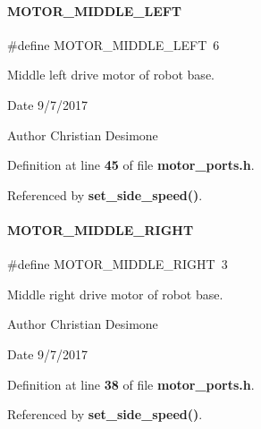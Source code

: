 \paragraph{M\+O\+T\+O\+R\+\_\+\+M\+I\+D\+D\+L\+E\+\_\+\+L\+E\+FT}
{\footnotesize\ttfamily \#define M\+O\+T\+O\+R\+\_\+\+M\+I\+D\+D\+L\+E\+\_\+\+L\+E\+FT~6}



Middle left drive motor of robot base. 

\begin{DoxyDate}{Date}
9/7/2017 
\end{DoxyDate}
\begin{DoxyAuthor}{Author}
Christian Desimone 
\end{DoxyAuthor}


Definition at line \textbf{ 45} of file \textbf{ motor\+\_\+ports.\+h}.



Referenced by \textbf{ set\+\_\+side\+\_\+speed()}.

\mbox{\label{motor__ports_8h_a0da3f792b8f28ab09b339295859d8334}} 
\paragraph{M\+O\+T\+O\+R\+\_\+\+M\+I\+D\+D\+L\+E\+\_\+\+R\+I\+G\+HT}
{\footnotesize\ttfamily \#define M\+O\+T\+O\+R\+\_\+\+M\+I\+D\+D\+L\+E\+\_\+\+R\+I\+G\+HT~3}



Middle right drive motor of robot base. 

\begin{DoxyAuthor}{Author}
Christian Desimone 
\end{DoxyAuthor}
\begin{DoxyDate}{Date}
9/7/2017 
\end{DoxyDate}


Definition at line \textbf{ 38} of file \textbf{ motor\+\_\+ports.\+h}.



Referenced by \textbf{ set\+\_\+side\+\_\+speed()}.

\mbox{\label{motor__ports_8h_a85596f3eea4e187ef652eac88014726f}} 
